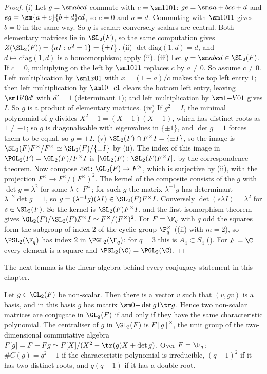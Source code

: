 \begin{proof}
(i) Let $g=\sm abcd$ commute with $e=\sm1101$: $ge=\sm a{a+b}c{c+d}$ and $eg=\sm{a+c}{b+d}cd$, so $c=0$ and $a=d$. Commuting with $\sm1011$ gives
$b=0$ in the same way. So $g$ is scalar; conversely scalars are central. Both elementary matrices lie in $\SL_2(F)$, so the same computation gives
$Z(\SL_2(F))=\{aI:a^2=1\}=\{\pm I\}$. (ii) $\det\mathrm{diag}(1,d)=d$, and $d\mapsto\mathrm{diag}(1,d)$ is a homomorphism; apply (ii).
(iii) Let $g=\sm abcd\in\SL_2(F)$. If $c=0$, multiplying on the left by $\sm1011$ replaces $c$ by $a\ne0$. So assume $c\ne0$. Left multiplication by
$\sm1x01$ with $x=(1-a)/c$ makes the top left entry $1$; then left multiplication by $\sm10{-c}1$ clears the bottom left entry, leaving $\sm1{b'}0{d'}$
with $d'=1$ (determinant $1$); and left multiplication by $\sm1{-b'}01$ gives $I$. So $g$ is a product of elementary matrices. (iv) If $g^2=I$, the
minimal polynomial of $g$ divides $X^2-1=(X-1)(X+1)$, which has distinct roots as $1\ne-1$; so $g$ is diagonalisable with eigenvalues in $\{\pm1\}$, and
$\det g=1$ forces them to be equal, so $g=\pm I$. (v) $\SL_2(F)\cap F^\times I=\{\pm I\}$, so the image is $\SL_2(F)F^\times/F^\times\simeq\SL_2(F)/\{\pm I\}$ by
(ii). The index of this image in $\PGL_2(F)=\GL_2(F)/F^\times I$ is $[\GL_2(F):\SL_2(F)F^\times I]$, by the correspondence theorem. Now
compose $\det\colon\GL_2(F)\to F^\times$, which is surjective by (ii), with the projection $F^\times\to F^\times/(F^\times)^2$. The kernel of the composite consists of the $g$
with $\det g=\lambda^2$ for some $\lambda\in F^\times$; for such $g$ the matrix $\lambda^{-1}g$ has determinant $\lambda^{-2}\det g=1$, so $g=(\lambda^{-1}g)(\lambda I)\in\SL_2(F)F^\times I$.
Conversely $\det(s\lambda I)=\lambda^2$ for $s\in\SL_2(F)$. So the kernel is $\SL_2(F)F^\times I$, and the first isomorphism theorem gives
$\GL_2(F)/\SL_2(F)F^\times I\simeq F^\times/(F^\times)^2$. For $F=\F_q$ with $q$ odd the squares form the subgroup of index $2$ of the cyclic group $\F_q^\times$
((ii) with $m=2$), so $\PSL_2(\F_q)$ has index $2$ in $\PGL_2(\F_q)$; for $q=3$ this is $A_4\subset S_4$ (). For $F=\C$
every element is a square and $\PSL_2(\C)=\PGL_2(\C)$.
\end{proof}

The next lemma is the linear algebra behind every conjugacy statement in this chapter.

\begin{lemma}\label{lem:groups:companion}
Let $g\in\GL_2(F)$ be non-scalar. Then there is a vector $v$ such that $(v,gv)$ is a basis, and in this basis $g$ has matrix $\sm0{-\det g}1{\tr g}$. Hence two
non-scalar matrices are conjugate in $\GL_2(F)$ if and only if they have the same characteristic polynomial. The centraliser of $g$ in $\GL_2(F)$ is
$F[g]^\times$, the unit group of the two-dimensional commutative algebra $F[g]=F+Fg\simeq F[X]/(X^2-\tr(g)X+\det g)$. Over $F=\F_q$:
$\#C(g)=q^2-1$ if the characteristic polynomial is irreducible, $(q-1)^2$ if it has two distinct roots, and $q(q-1)$ if it has a double root.
\end{lemma}

